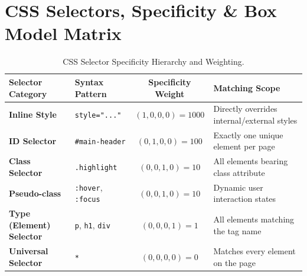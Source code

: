 \section{CSS Selectors, Specificity \& Box Model Matrix}

\begin{table}[htbp]
\centering
\small
\renewcommand{\arraystretch}{1.2}
\begin{tabularx}{\linewidth}{llcl}
\toprule
\textbf{Selector Category} & \textbf{Syntax Pattern} & \textbf{Specificity Weight} & \textbf{Matching Scope} \\
\midrule
\textbf{Inline Style} & \texttt{style="..."} & $(1, 0, 0, 0) = 1000$ & Directly overrides internal/external styles \\
\textbf{ID Selector} & \texttt{\#main-header} & $(0, 1, 0, 0) = 100$ & Exactly one unique element per page \\
\textbf{Class Selector} & \texttt{.highlight} & $(0, 0, 1, 0) = 10$ & All elements bearing class attribute \\
\textbf{Pseudo-class} & \texttt{:hover}, \texttt{:focus} & $(0, 0, 1, 0) = 10$ & Dynamic user interaction states \\
\textbf{Type (Element) Selector} & \texttt{p}, \texttt{h1}, \texttt{div} & $(0, 0, 0, 1) = 1$ & All elements matching the tag name \\
\textbf{Universal Selector} & \texttt{*} & $(0, 0, 0, 0) = 0$ & Matches every element on the page \\
\bottomrule
\end{tabularx}
\caption{CSS Selector Specificity Hierarchy and Weighting.}
\label{tab:master-specificity}
\end{table}

